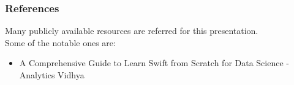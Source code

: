 \begin{frame}\frametitle{References}
Many publicly available resources are referred for this presentation. \\

\scriptsize
Some of the notable ones are:
\begin{itemize}
\item A Comprehensive Guide to Learn Swift from Scratch for Data Science - Analytics Vidhya
\end{itemize}
\end{frame}

